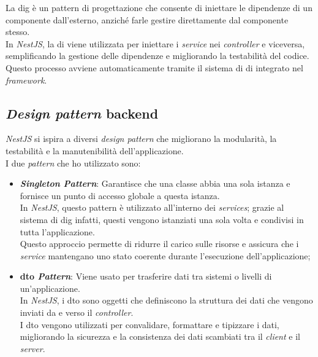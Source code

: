 \noindent La \gls{dig} è un pattern di progettazione che consente di iniettare le dipendenze di un componente dall'esterno, anziché farle gestire direttamente dal componente stesso. \\
In \textit{NestJS}, la \gls{di} viene utilizzata per iniettare i \textit{service} nei \textit{controller} e viceversa, semplificando la gestione delle dipendenze e migliorando la testabilità del codice. \\
Questo processo avviene automaticamente tramite il sistema di \gls{di} integrato nel \textit{framework}.

\subsection*{\textit{Design pattern} \gls{backend}}

\textit{NestJS} si ispira a diversi \textit{design pattern} che migliorano la modularità, la testabilità e la manutenibilità dell'applicazione.\\

\noindent I due \textit{pattern} che ho utilizzato sono:
\begin{itemize}
    \item \textbf{\textit{Singleton Pattern}}: Garantisce che una classe abbia una sola istanza e fornisce un punto di accesso globale a questa istanza.\\
    In \textit{NestJS}, questo pattern è utilizzato all'interno dei \textit{services};
    grazie al sistema di \gls{dig} infatti, questi vengono istanziati una sola volta e condivisi in tutta l'applicazione.\\
    Questo approccio permette di ridurre il carico sulle risorse e assicura che i \textit{service} mantengano uno stato coerente durante l'esecuzione dell'applicazione;
    \item \textbf{\gls{dto} \textit{Pattern}}: Viene usato per trasferire dati tra sistemi o livelli di un'applicazione.\\
    In \textit{NestJS}, i \gls{dto} sono oggetti che definiscono la struttura dei dati che vengono inviati da e verso il \textit{controller}.\\
    I \gls{dto} vengono utilizzati per convalidare, formattare e tipizzare i dati, migliorando la sicurezza e la consistenza dei dati scambiati tra il \textit{client} e il \textit{server}. \\   
\end{itemize}
